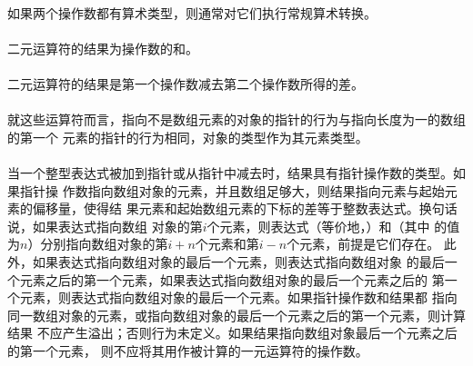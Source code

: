 \semantic
\paragraph{}
如果两个操作数都有算术类型，则通常对它们执行常规算术转换。

\paragraph{}
二元\tm{+}运算符的结果为操作数的和。

\paragraph{}
二元\tm{-}运算符的结果是第一个操作数减去第二个操作数所得的差。

\paragraph{}
就这些运算符而言，指向不是数组元素的对象的指针的行为与指向长度为一的数组的第一个
元素的指针的行为相同，对象的类型作为其元素类型。

\paragraph{}
当一个整型表达式被加到指针或从指针中减去时，结果具有指针操作数的类型。如果指针操
作数指向数组对象的元素，并且数组足够大，则结果指向元素与起始元素的偏移量，使得结
果元素和起始数组元素的下标的差等于整数表达式。换句话说，如果表达式指向数组
对象的第$i$个元素，则表达式（等价地，）和（其中
的值为$n$）分别指向数组对象的第$i+n$个元素和第$i-n$个元素，前提是它们存在。
此外，如果表达式指向数组对象的最后一个元素，则表达式指向数组对象
的最后一个元素之后的第一个元素，如果表达式指向数组对象的最后一个元素之后的
第一个元素，则表达式指向数组对象的最后一个元素。如果指针操作数和结果都
指向同一数组对象的元素，或指向数组对象的最后一个元素之后的第一个元素，则计算结果
不应产生溢出；否则行为未定义。如果结果指向数组对象最后一个元素之后的第一个元素，
则不应将其用作被计算的一元\tm{*}运算符的操作数。

